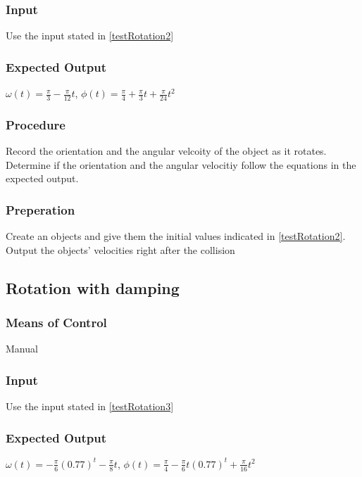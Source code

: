 \documentclass[12pt]{article}
\begin{document}
\subsubsection{Input}
Use the input stated in \ref{testRotation2}

\subsubsection{Expected Output}

$\omega(t) = \frac{\pi}{3} - \frac{\pi}{12}t$, 
$\phi(t) = \frac{\pi}{4} + \frac{\pi}{3}t + \frac{\pi}{24}t^2$

\subsubsection{Procedure}
Record the orientation and the angular velcoity of the object as it rotates. Determine if the 
orientation and the angular velocitiy follow the equations in the expected output.  

\subsubsection{Preperation}
Create an objects and give them the initial values indicated in \ref{testRotation2}.
Output the objects' velocities right after the collision



\subsection{Rotation with damping}
\subsubsection{Means of Control}
Manual
\subsubsection{Input}
Use the input stated in \ref{testRotation3}

\subsubsection{Expected Output}

$\omega(t) = -\frac{\pi}{6}(0.77)^{t} - \frac{\pi}{8}t$, 
$\phi(t) = \frac{\pi}{4} - \frac{\pi}{6}t(0.77)^{t} + \frac{\pi}{16}t^2$
\end{document}
